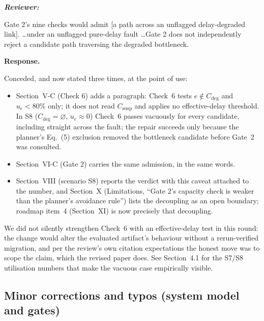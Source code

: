 \documentclass[11pt,a4paper]{article}
\newenvironment{reviewer}{\par\medskip\noindent\begin{minipage}{\linewidth}\small\itshape\color{quote}\textbf{Reviewer:}\par}{\end{minipage}\medskip\par}
\newenvironment{response}{\par\noindent\begin{minipage}{\linewidth}\small\textbf{Response.}\par}{\end{minipage}\medskip\par}
\begin{document}
\begin{reviewer}
Gate 2's nine checks would admit [a path across an unflagged delay-degraded
link]. \dots under an unflagged pure-delay fault \dots Gate 2 does not
independently reject a candidate path traversing the degraded bottleneck.
\end{reviewer}

\begin{response}
Conceded, and now stated three times, at the point of use:

\begin{itemize}
  \item Section~V-C (Check 6) adds a paragraph: Check~6 tests
    $e\notin C_{\mathrm{deg}}$ and $u_e < 80\%$ only; it does not read
    $C_{\mathrm{susp}}$ and applies no effective-delay threshold. In S8
    ($C_{\mathrm{deg}}=\varnothing$, $u_e \approx 0$) Check~6 passes
    vacuously for every candidate, including straight across the fault; the
    repair succeeds only because the planner's Eq.~(5) exclusion removed the
    bottleneck candidate before Gate~2 was consulted.
  \item Section~VI-C (Gate 2) carries the same admission, in the same
    words.
  \item Section~VIII (scenario S8) reports the verdict with this caveat
    attached to the number, and Section~X (Limitations, ``Gate 2's capacity
    check is weaker than the planner's avoidance rule'') lists the decoupling
    as an open boundary; roadmap item~4 (Section~XI) is now precisely that
    decoupling.
\end{itemize}

We did not silently strengthen Check~6 with an effective-delay test in this
round: the change would alter the evaluated artifact's behaviour without a
rerun-verified migration, and per the review's own citation expectations the
honest move was to scope the claim, which the revised paper does. See
Section~4.1 for the S7/S8 utilisation numbers that make the vacuous case
empirically visible.
\end{response}

\subsection{Minor corrections and typos (system model and gates)}
\end{document}
